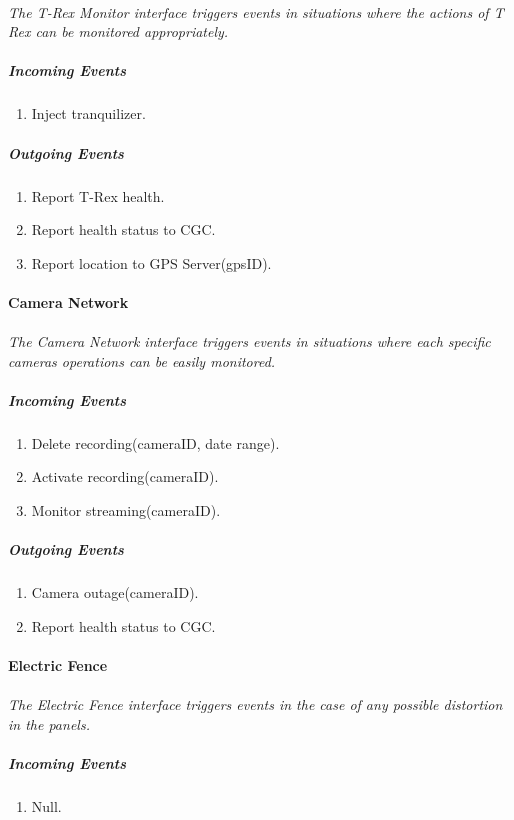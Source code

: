 \documentclass[12pt]{article}
\begin{document}
	\paragraph{}\textit{The T-Rex Monitor interface triggers events in situations where the actions of T Rex can be monitored appropriately. }
	    \subparagraph{Incoming Events}
		\begin{enumerate}
			\item Inject tranquilizer. 
		\end{enumerate}
				
	    \subparagraph{Outgoing Events}
		\begin{enumerate}
			\item Report T-Rex health.
			\item Report health status to CGC.
			\item Report location to GPS Server(gpsID).
		\end{enumerate}

	\paragraph{Camera Network}
	\paragraph{}\textit{The Camera Network interface triggers events in situations where each specific cameras operations can be easily monitored. }
	    \subparagraph{Incoming Events}
		\begin{enumerate}
			\item Delete recording(cameraID, date range).
			\item Activate recording(cameraID).
			\item Monitor streaming(cameraID).
		\end{enumerate}
		
	    \subparagraph{Outgoing Events}
		\begin{enumerate}
			\item Camera outage(cameraID).
			\item Report health status to CGC. 
		\end{enumerate}

	\paragraph{Electric Fence}
	\paragraph{}\textit{The Electric Fence interface triggers events in the case of any possible distortion in the panels. }
	    \subparagraph{Incoming Events}
		\begin{enumerate}
			\item Null.
		\end{enumerate}
				
\end{document}
